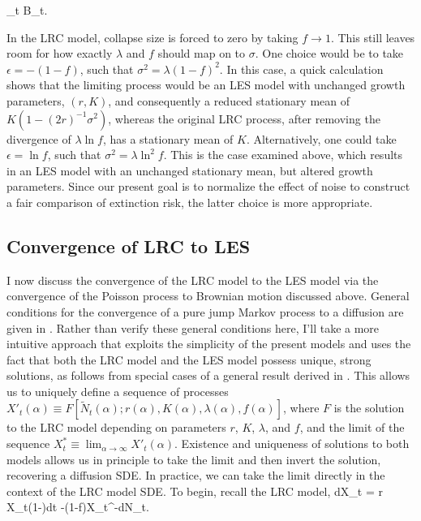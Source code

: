 \be
\epsilon {}_t   \sqrt{\lambda}\epsilon B_t.
\ee

In the LRC model, collapse size is forced to zero by taking $f\to 1$.  This still leaves room for how exactly $\lambda$ and $f$ should map on to $\sigma$.  One choice would be to take $\epsilon = -(1-f)$, such that $\sigma^2 = \lambda (1-f)^2$.  In this case, a quick calculation shows that the limiting process would be an LES model with unchanged growth parameters, $(r,K)$, and consequently a reduced stationary mean of $K(1-(2r)^{-1}\sigma^2)$, whereas the original LRC process, after removing the divergence of $\lambda\ln f$, has a stationary mean of $K$.  Alternatively, one could take  $\epsilon = \ln f$, such that $\sigma^2 = \lambda \ln^2f$.  This is the case examined above, which results in an LES model with an unchanged stationary mean, but altered growth parameters.  Since our present goal is to normalize the effect of noise to construct a fair comparison of extinction risk, the latter choice is more appropriate.


\subsection{Convergence of LRC to LES}

I now discuss the convergence of the LRC model to the LES model via the convergence of the Poisson process to Brownian motion discussed above.  General conditions for the convergence of a pure jump Markov process to a diffusion are given in \cite{jacod2013limit}.  Rather than verify these general conditions here, I'll take a more intuitive approach that exploits the simplicity of the present models and uses the fact that both the LRC model and the LES model possess unique, strong solutions, as follows from special cases of a general result derived in \cite{bao2011competitive}.  This allows us to uniquely define a sequence of processes $X'_t(\alpha) \equiv F[\tilde{N}_t(\alpha); r(\alpha),K(\alpha),\lambda(\alpha),f(\alpha)]$, where $F$ is the solution to the LRC model depending on parameters $r$, $K$, $\lambda$, and $f$, and the limit of the sequence $X^*_t \equiv \lim_{\alpha\to\infty} X'_t(\alpha)$.   Existence and uniqueness of solutions to both models allows us in principle to take the limit and then invert the solution, recovering a diffusion SDE.  In practice, we can take the limit directly in the context of the LRC model SDE.  
To begin, recall the LRC model,
\be
dX_t = r X_t\left(1-\right)dt -(1-f)X_{t^-}dN_t.
\ee


